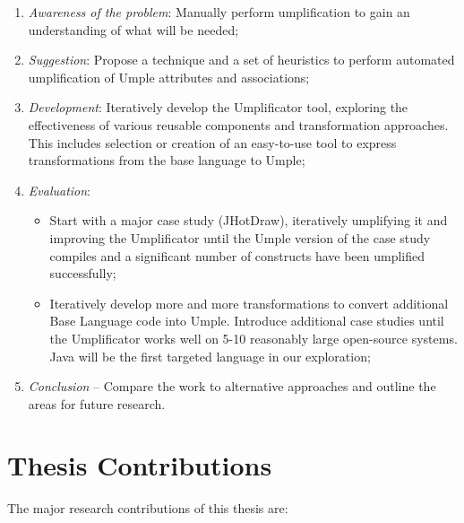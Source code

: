 \begin{enumerate}
\item \textit{Awareness of the problem}: Manually perform umplification to gain an understanding of what will be needed;

\item \textit{Suggestion}: Propose a technique and a set of heuristics to perform automated umplification of Umple attributes and associations;

\item \textit{Development}:	Iteratively develop the Umplificator tool, exploring the effectiveness of various reusable components and transformation approaches. This includes selection or creation of an easy-to-use tool to express transformations from the base language to Umple;

\item  \textit{Evaluation}: 
\begin{itemize}
\item Start with a major case study (JHotDraw), iteratively umplifying it and improving the Umplificator until the Umple version of the case study compiles and a significant number of constructs have been umplified successfully;
\item Iteratively develop more and more transformations to convert additional Base Language code into Umple. Introduce additional case studies until the Umplificator works well on 5-10 reasonably large open-source systems. Java will be the first targeted language in our exploration; 
\end{itemize}

\item \textit{Conclusion} -- Compare the work to alternative approaches and outline the areas for future research.
\end{enumerate}
\section{Thesis Contributions}

The major research contributions of this thesis are:

